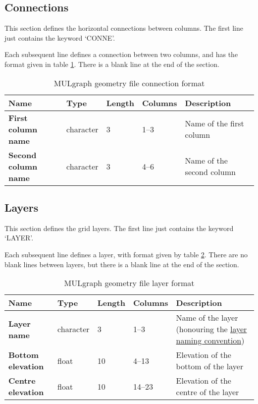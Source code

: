 \subsection{Connections}
This section defines the horizontal connections between columns. The first line just contains the keyword `CONNE'.

Each subsequent line defines a connection between two columns, and has the format given in table \ref{tb:mulgraph_format_connection}. There is a blank line at the end of the section.

\begin{table}[h]
  \begin{center}
    \begin{tabular}{|p{20mm}|l|l|l|p{50mm}|}
      \hline
      \textbf{Name} & \textbf{Type} & \textbf{Length} & \textbf{Columns} & \textbf{Description}\\
      \hline
      \textbf{First column name} & character & 3 & 1--3 & Name of the first column\\
      \hline
      \textbf{Second column name} & character & 3 & 4--6 & Name of the second column\\
      \hline
    \end{tabular}
    \caption{MULgraph geometry file connection format}
    \label{tb:mulgraph_format_connection}
  \end{center}
\end{table}

\subsection{Layers}
This section defines the grid layers. The first line just contains the keyword `LAYER'.

Each subsequent line defines a layer, with format given by table \ref{tb:mulgraph_format_layer}. There are no blank lines between layers, but there is a blank line at the end of the section.

\begin{table}[h]
  \begin{center}
    \begin{tabular}{|p{20mm}|l|l|l|p{50mm}|}
      \hline
      \textbf{Name} & \textbf{Type} & \textbf{Length} & \textbf{Columns} & \textbf{Description}\\
      \hline
      \textbf{Layer name} & character & 3 & 1--3 & Name of the layer (honouring the \hyperref[tb:mulgrid_conventions]{layer naming convention})\\
      \hline
      \textbf{Bottom elevation} & float & 10 & 4--13 & Elevation of the bottom of the layer\\
      \hline
      \textbf{Centre elevation} & float & 10 & 14--23 & Elevation of the centre of the layer\\
      \hline
    \end{tabular}
    \caption{MULgraph geometry file layer format}
    \label{tb:mulgraph_format_layer}
  \end{center}
\end{table}

